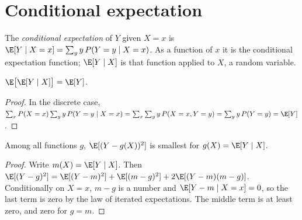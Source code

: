 \label{out:b1:random-variables-for-econometrics:joint}

\section{Conditional expectation}\label{sec:b1:random-variables-for-econometrics:cef}

\begin{definition}\label{def:b1:random-variables-for-econometrics:conditional-expectation}
The \emph{conditional expectation} of $Y$ given $X = x$ is $\E[Y \mid X = x] = \sum_y y\,P(Y = y \mid X = x)$.
As a function of $x$ it is the conditional expectation function; $\E[Y \mid X]$ is that function
applied to $X$, a random variable.
\end{definition}

\begin{theorem}\label{thm:b1:random-variables-for-econometrics:lie}
$\E\big[\E[Y \mid X]\big] = \E[Y]$.
\end{theorem}

\begin{proof}
In the discrete case,
$\sum_x P(X = x)\sum_y y\,P(Y = y \mid X = x) = \sum_x\sum_y y\,P(X = x, Y = y) = \sum_y y\,P(Y = y) = \E[Y]$.
\end{proof}

\label{lst:b1:random-variables-for-econometrics:iterated}

\label{out:b1:random-variables-for-econometrics:iterated}

\begin{proposition}\label{prop:b1:random-variables-for-econometrics:best}
Among all functions $g$, $\E[(Y - g(X))^2]$ is smallest for $g(X) = \E[Y \mid X]$.
\end{proposition}

\begin{proof}
Write $m(X) = \E[Y \mid X]$. Then $\E[(Y - g)^2] = \E[(Y - m)^2] + \E[(m - g)^2] + 2\E[(Y - m)(m - g)]$. Conditionally on
$X = x$, $m - g$ is a number and $\E[Y - m \mid X = x] = 0$, so the last term is zero by the law of
iterated expectations. The middle term is at least zero, and zero for $g = m$.
\end{proof}

